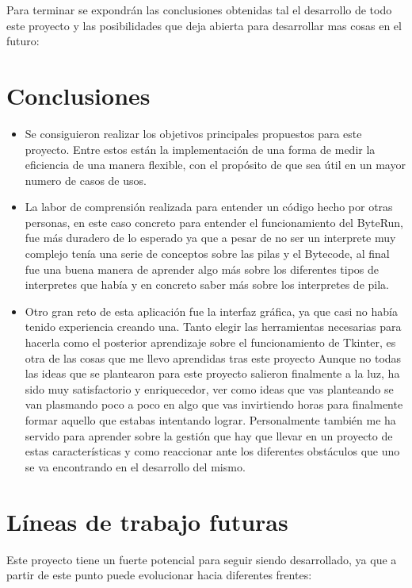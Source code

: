 
Para terminar se expondrán las conclusiones obtenidas tal el desarrollo de todo este proyecto y las posibilidades que deja abierta para desarrollar mas cosas en el futuro:
\section{Conclusiones}
\begin{itemize}
	\item Se consiguieron realizar los objetivos principales propuestos para este proyecto. Entre estos están la implementación de una forma de medir la eficiencia de una manera flexible, con el propósito de que sea útil en un mayor numero de casos de usos.
	\item La labor de comprensión realizada para entender un código hecho por otras personas, en este caso concreto para entender el funcionamiento del ByteRun, fue más duradero de lo esperado ya que a pesar de no ser un interprete muy complejo tenía una serie de conceptos sobre las pilas y el Bytecode, al final fue una buena manera de aprender algo más sobre los diferentes tipos de interpretes que había y en concreto saber más sobre los interpretes de pila.
	\item Otro gran reto de esta aplicación fue la interfaz gráfica, ya que casi no había tenido experiencia creando una. Tanto elegir las herramientas necesarias para hacerla como el posterior aprendizaje sobre el funcionamiento de Tkinter, es otra de las cosas que me llevo aprendidas tras este proyecto
Aunque no todas las ideas que se plantearon para este proyecto salieron finalmente a la luz, ha sido muy satisfactorio y enriquecedor, ver como ideas que vas planteando se van plasmando poco a poco en algo que vas invirtiendo horas para finalmente formar aquello que estabas intentando lograr. Personalmente también me ha servido para aprender sobre la gestión que hay que llevar en un proyecto de estas características y como reaccionar ante los diferentes obstáculos que uno se va encontrando en el desarrollo del mismo.
\end{itemize}


\section{Líneas de trabajo futuras}
Este proyecto tiene un fuerte potencial para seguir siendo desarrollado, ya que a partir de este punto puede evolucionar hacia diferentes frentes:\\

